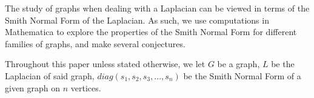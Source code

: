 The study of graphs when dealing with a Laplacian can be viewed in terms of the Smith Normal Form of the Laplacian. As such, we use computations in Mathematica to explore the properties of the Smith Normal Form for different families of graphs, and make several conjectures.

Throughout this paper unless stated otherwise, we let $G$ be a graph, $L$ be the Laplacian of said graph, $diag(s_1,s_2,s_3,...,s_n)$ be the Smith Normal Form of a given graph on $n$ vertices.